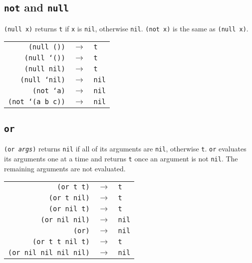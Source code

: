 \documentclass[12pt]{article}
\begin{document}
\subsection*{\texttt{not} and \texttt{null}}
\texttt{(null x)} returns \texttt{t} if \texttt{x} is \texttt{nil}, otherwise \texttt{nil}. 
\texttt{(not x)} is the same as \texttt{(null x)}.
\begin{center}
\begin{tabular}{rcl}
\texttt{(null ())} & $\to$ & \texttt{t} \\
\texttt{(null `())} & $\to$ & \texttt{t} \\
\texttt{(null nil)} & $\to$ & \texttt{t} \\
\texttt{(null `nil)} & $\to$ & \texttt{nil} \\
\texttt{(not `a)} & $\to$ & \texttt{nil} \\
\texttt{(not `(a b c))} & $\to$ & \texttt{nil} \\
\end{tabular}
\end{center}
\subsection*{\texttt{or}}
\texttt{(or \emph{args})} returns \texttt{nil} if all of its arguments are \texttt{nil}, otherwise \texttt{t}.
\texttt{or} evaluates its arguments one at a time and returns \texttt{t} once an argument is not \texttt{nil}.
The remaining arguments are not evaluated.
\begin{center}
\begin{tabular}{rcl}
\texttt{(or t t)} & $\to$ & \texttt{t} \\
\texttt{(or t nil)} & $\to$ & \texttt{t} \\
\texttt{(or nil t)} & $\to$ & \texttt{t} \\
\texttt{(or nil nil)} & $\to$ & \texttt{nil} \\
\texttt{(or)} & $\to$ & \texttt{nil} \\
\texttt{(or t t nil t)} & $\to$ & \texttt{t} \\
\texttt{(or nil nil nil nil)} & $\to$ & \texttt{nil}
\end{tabular}
\end{center}
\end{document}
